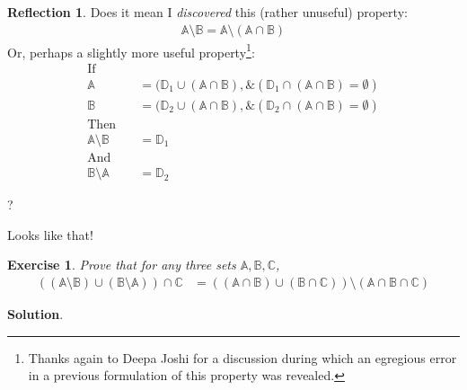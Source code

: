 \documentclass[11pt]{book}
\theoremstyle{definition}
\theoremstyle{plain}
\newtheorem{exercise}{Exercise}
\theoremstyle{definition}
\theoremstyle{problemstyle}
\theoremstyle{remark}
\theoremstyle{definition}
\newtheorem{reflection}{Reflection}
\begin{document}
\begin{reflection}
    Does it mean I \emph{discovered} this (rather unuseful) property:
    \begin{align*}
        \mathbb{A}\setminus\mathbb{B}=\mathbb{A}\setminus(\mathbb{A}\cap\mathbb{B})
    \end{align*}
    Or, perhaps a slightly more useful property\footnote{Thanks again to Deepa Joshi for a discussion during which an egregious error in a previous formulation of this property was revealed.}:
    \begin{align}
        \text{If}\quad&\nonumber\\
            \mathbb{A}&=(\mathbb{D}_{1}\cup(\mathbb{A}\cap\mathbb{B}), \&(\mathbb{D}_{1}\cap(\mathbb{A}\cap\mathbb{B})=\emptyset)\nonumber\\
            \mathbb{B}&=(\mathbb{D}_{2}\cup(\mathbb{A}\cap\mathbb{B}), \&(\mathbb{D}_{2}\cap(\mathbb{A}\cap\mathbb{B})=\emptyset)\nonumber\\
        \text{Then}\quad&\nonumber\\
            \mathbb{A}\setminus\mathbb{B}&=\mathbb{D}_1\label{eq:set-minus-discovery-1}\\
        \text{And}\quad&\nonumber\\
            \mathbb{B}\setminus\mathbb{A}&=\mathbb{D}_2\label{eq:set-minus-discovery-2}
    \end{align}

    ?

    Looks like that!
\end{reflection}
\begin{exercise}
    \label{ex:1.8.19}
    Prove that for any three sets $\mathbb{A,B,C}$,
    \begin{align}
        \label{eq:bowtie-in-3-set-venn}
        ((\mathbb{A}\setminus\mathbb{B})\cup(\mathbb{B}\setminus\mathbb{A}))\cap\mathbb{C}&=((\mathbb{A}\cap\mathbb{B})\cup(\mathbb{B}\cap\mathbb{C}))\setminus(\mathbb{A}\cap\mathbb{B}\cap\mathbb{C})
    \end{align}
\end{exercise}
\textbf{Solution}.
\end{document}
